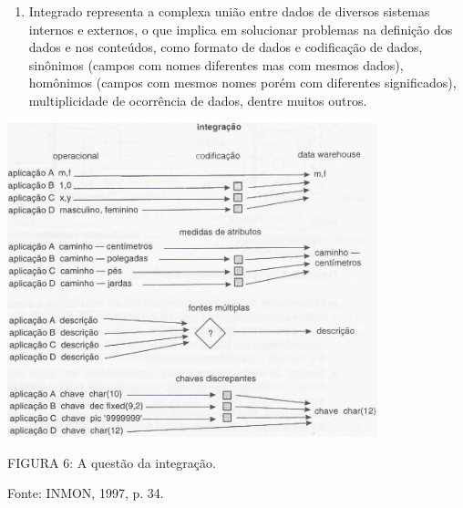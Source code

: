 \documentclass[a4paper]{article}
\newcounter{saveenum}
\newcommand\liststyleWWviiiNumxii{%
\renewcommand\theenumi{\alph{enumi}}
\renewcommand\theenumii{\arabic{enumii}}
\renewcommand\theenumiii{\arabic{enumiii}}
\renewcommand\theenumiv{\arabic{enumiv}}
\renewcommand\labelenumi{\theenumi)}
\renewcommand\labelenumii{\theenumii.}
\renewcommand\labelenumiii{\theenumiii.}
\renewcommand\labelenumiv{\theenumiv.}
}
\begin{document}
\liststyleWWviiiNumxii
\setcounter{saveenum}{\value{enumi}}
\begin{enumerate}
\setcounter{enumi}{\value{saveenum}}
\item {
\textsf{Integrado representa a complexa uni\~ao entre dados de diversos sistemas internos e externos, o que implica em
solucionar problemas na defini\c{c}\~ao dos dados e nos conte\'udos, como formato de dados e codifica\c{c}\~ao de
dados, sin\^onimos (campos com nomes diferentes mas com mesmos dados), hom\^onimos (campos com mesmos nomes por\'em com
diferentes significados), multiplicidade de ocorr\^encia de dados, dentre muitos outros. }}
\end{enumerate}
 \includegraphics[width=10.739cm,height=9.118cm]{monograph-img006.jpg} 

{
\textsf{\MakeUppercase{FIGURA }}\textsf{6: A quest\~ao da integra\c{c}\~ao. }}

{
\textsf{Fonte: INMON, 1997, p. 34. \ }}
\end{document}
